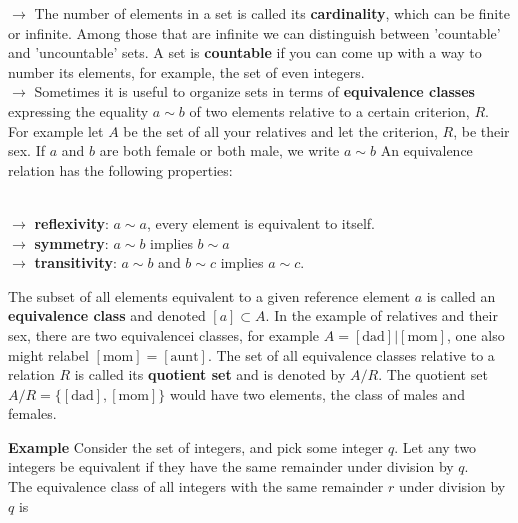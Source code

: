 \documentclass[11pt, oneside]{article}   	%
\begin{document}
$\rightarrow$ The number of elements in a set is called its \textbf{cardinality}, which can be finite or infinite. Among those that are infinite we can distinguish between 'countable' and 'uncountable' sets. A set is \textbf{countable} if you can come up with a way to number its elements, for example, the set of even integers. \\

$\rightarrow$ Sometimes it is useful to organize sets in terms of \textbf{equivalence classes} expressing the equality $a \sim b$ of two elements relative to a certain criterion, $R$. For example let $A$ be the set of all your relatives and let the criterion, $R$, be their sex. If $a$ and $b$ are both female or both male, we write $a \sim b$ An equivalence relation has the following properties: \\\\
\begin{tcolorbox}[colback = red!5!white, colframe = red!50!black, title
  = Equivalence Classes]

$\rightarrow$ \textbf{reflexivity}: $a \sim a$, every element is equivalent to itself. \\
$\rightarrow$ \textbf{symmetry}: $a \sim b$ implies $b \sim a$ \\ 
$\rightarrow$ \textbf{transitivity}: $a \sim b$ and $b \sim c$ implies $a \sim c$. 

\end{tcolorbox}

The subset of all elements equivalent to a given reference element $a$ is
called an \textbf{equivalence class} and denoted $[a] \subset A$. In the
example of relatives and their sex, there are two equivalencei classes, for example $A = [\text{dad}] | [\text{mom}]$, one also might relabel $[\text{mom}] = [\text{aunt}]$. The set of all equivalence classes relative to a relation $R$ is called its \textbf{quotient set} and is denoted by $A/R$. The quotient set $A/R = \{[\text{dad}], [\text{mom}]\}$ would have two elements, the class of males and females. \\

\vspace{20px}

\textbf{Example} Consider the set of integers, and pick some integer $q$. Let any two integers be equivalent if they have the same remainder under division by $q$. \\

The equivalence class of all integers with the same remainder $r$ under division by $q$ is 
\end{document}
